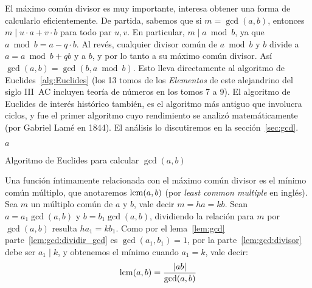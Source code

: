   El máximo común divisor es muy importante,
  interesa obtener una forma de calcularlo eficientemente.
  De partida,
  sabemos que si \(m = \gcd(a, b)\),
  entonces \(m \mid u \cdot a + v \cdot b\)
  para todo par \(u, v\).
  En particular,
  \(m \mid a \bmod b\),
  ya que \(a \bmod b = a - q \cdot b\).
  Al revés,
  cualquier divisor común de \(a \bmod b\) y \(b\)
  divide a \(a = a \bmod b + q b\) y a \(b\),
  y por lo tanto a su máximo común divisor.
  Así \(\gcd(a, b) = \gcd(b, a \bmod b)\).
  Esto lleva directamente al algoritmo de Euclides~\ref{alg:Euclides}%
  (los 13 tomos de los \emph{Elementos} de este alejandrino del siglo III~AC%
   incluyen teoría de números en los tomos 7 a 9).
  El algoritmo de Euclides de interés histórico también,
  es el algoritmo más antiguo que involucra ciclos,
  y fue el primer algoritmo cuyo rendimiento se analizó matemáticamente
  (por Gabriel Lamé en 1844).%
  El análisis lo discutiremos en la sección~\ref{sec:gcd}.
  \begin{algorithm}[htbp]
    \DontPrintSemicolon

    \KwFunction {} \;
    \BlankLine
    \Return \(a\) \;
    \caption{Algoritmo de Euclides para calcular $\gcd(a, b)$}
    \label{alg:Euclides}
  \end{algorithm}

  Una función íntimamente relacionada con el máximo común divisor
  es el mínimo común múltiplo,
  que anotaremos \(\operatorname{lcm}(a, b)\)%
  (por \emph{\foreignlanguage{english}{least common multiple}} en inglés).
  Sea \(m\) un múltiplo común de \(a\) y \(b\),
  vale decir \(m = h a = k b\).
  Sean \(a = a_1 \gcd(a, b)\) y \(b = b_1 \gcd(a, b)\),
  dividiendo la relación para \(m\) por \(\gcd(a, b)\)
  resulta \(h a_1 = k b_1\).
  Como por el lema~\ref{lem:gcd} parte~\ref{lem:gcd:dividir_gcd}
  es \(\gcd(a_1, b_1) = 1\),
  por la parte~\ref{lem:gcd:divisor} debe ser  \(a_1 \mid k\),
  y obtenemos el mínimo cuando \(a_1 = k\),
  vale decir:
  \begin{equation}
    \label{eq:compute-lcm}
    \operatorname{lcm}(a, b) = \frac{\lvert a b  \rvert}{\gcd(a, b)}
  \end{equation}

